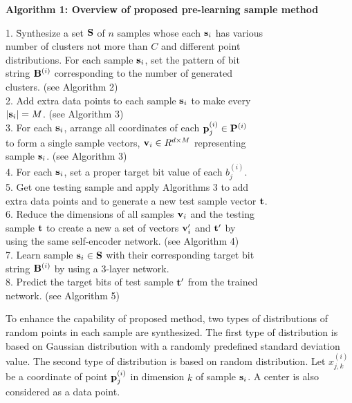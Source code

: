 \documentclass[lettersize,journal]{IEEEtran}
\begin{document}
\vspace{0.2in}
\noindent
{\bf Algorithm 1: Overview of proposed pre-learning sample method}
\label{alg1}        
\begin{tabbing}
1. \= Synthesize a set ${\bf S}$ of $n$ samples whose each ${\bf s}_{i}$ has various \\
   \> number of clusters not more than $C$ and different point \\
   \> distributions. For each sample ${\bf s}_{i}$, set the pattern of bit \\
   \> string ${\bf B}^{(i)}$ corresponding to the number of generated \\
   \> clusters. (see Algorithm 2) \\
2. \> Add extra data points to each sample ${\bf s}_{i}$ to make every \\
   \> $|{\bf s}_{i}| = M$. (see Algorithm 3) \\
3. \> For each ${\bf s}_{i}$, arrange all coordinates of each ${\bf p}^{(i)}_{j} \in {\bf P}^{(i)}$ \\
   \> to form a single sample vectors, ${\bf v}_{i} \in R^{d \times M}$ representing \\
   \> sample ${\bf s}_{i}$. (see Algorithm 3) \\
4. \> For each ${\bf s}_{i}$, set a proper target bit value of each $b^{(i)}_{j}$. \\
5. \> Get one testing sample and apply Algorithms 3 to add \\
   \> extra data points and to generate a new test sample vector ${\bf t}$. \\ 
6. \> Reduce the dimensions of all samples ${\bf v}_{i}$ and the testing \\
   \> sample ${\bf t}$ to create a new a set of vectors ${\bf v}^{\prime}_{i}$ and ${\bf t}^{\prime}$ by \\
   \> using the same self-encoder network. (see Algorithm 4) \\
7. \> Learn sample ${\bf s}_{i} \in {\bf S}$ with their corresponding target bit \\
   \> string ${\bf B}^{(i)}$ by using a 3-layer network. \\
8. \> Predict the target bits of test sample ${\bf t}^{\prime}$ from the trained \\
   \> network. (see Algorithm 5)
\end{tabbing}

To enhance the capability of proposed method, two types of distributions of random points in each sample 
are synthesized. The first type of distribution is based on Gaussian distribution with a randomly 
predefined standard deviation value. The second type of distribution is based on random distribution.
Let $x^{(i)}_{j,k}$ be a coordinate of point ${\bf p}^{(i)}_{j}$ in dimension $k$ of sample ${\bf s}_{i}$. 
A center is also considered as a data point.
\end{document}
